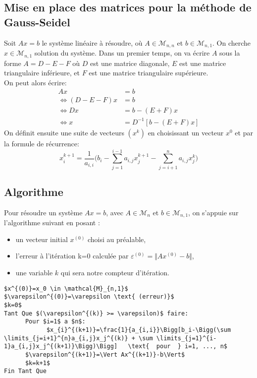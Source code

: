 \subsection{Mise en place des matrices pour la méthode de Gauss-Seidel}\label{decompMatrice}
Soit $Ax=b$ le système linéaire à résoudre, où $A\in \mathcal{M}_{n,n}$ et $b\in  \mathcal{M}_{n,1}$. On cherche $x\in \mathcal{M}_{n,1}$ solution du système.
Dans un premier temps, on va écrire $A$ sous la forme $A=D-E-F$ où $D$ est une matrice diagonale, $E$ est une matrice triangulaire inférieure, et $F$ est une matrice triangulaire supérieure. \\
On peut alors écrire:
\begin{align}
  Ax&=b \\
  \Leftrightarrow  (D-E-F)x&=b \\
  \Leftrightarrow  Dx&=b-(E+F)x \\
  \Leftrightarrow  x&=D^{-1}[b-(E+F)x]
\end{align}
On définit ensuite une suite de vecteurs $(x^k)$ en choisissant un vecteur $x^0$ et par la formule de récurrence:\\
\begin{equation}
  x_i^{k+1}=\frac{1}{a_{i,i}}\Bigg(b_i-\sum \limits_{j = 1}^{i-1}a_{i,j}x_{j}^{k+1} - \sum \limits_{j = i+1}^{n}a_{i,j}x_{j}^{k}\Bigg)
\end{equation}
\subsection{Algorithme}
Pour résoudre un système $Ax=b$, avec $A \in \mathcal{M}_{n}$ et $b\in \mathcal{M}_{n,1}$, on s'appuie sur l'algorithme suivant en posant :
\begin{itemize}
  \item un vecteur initial $x^{(0)}$ choisi au préalable,
  \item l'erreur à l'itération k=0 calculée par $\varepsilon^{(0)}=\Vert Ax^{(0)}-b\Vert$,
  \item une variable $k$ qui sera notre compteur d'itération.
\end{itemize}\vspace{6pt}
\label{algogs}

\begin{lstlisting}[mathescape=true, frame=single, basicstyle=\linespread{1.5}\fontsize{8}{10}\selectfont]
$x^{(0)}=x_0 \in \mathcal{M}_{n,1}$
$\varepsilon^{(0)}=\varepsilon \text{ (erreur)}$
$k=0$
Tant Que $(\varepsilon^{(k)} >= \varepsilon)$ faire:
      Pour $i=1$ a $n$:
            $x_{i}^{(k+1)}=\frac{1}{a_{i,i}}\Bigg[b_i-\Bigg(\sum \limits_{j=i+1}^{n}a_{i,j}x_j^{(k)} + \sum \limits_{j=1}^{i-1}a_{i,j}x_j^{(k+1)}\Bigg)\Bigg]   \text{  pour  } i=1, ..., n$
      $\varepsilon^{(k+1)}=\Vert Ax^{(k+1)}-b\Vert$
      $k=k+1$
Fin Tant Que
\end{lstlisting}

